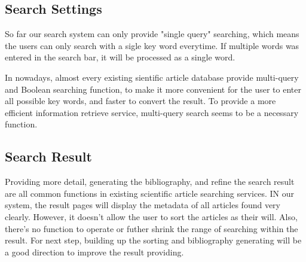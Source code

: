 \subsection{Search Settings}

So far our search system can only provide "single query" searching, which means the users can only search with a  sigle key word everytime.
If multiple words was entered in the search bar, it will be processed as a single word.

In nowadays, almost every existing sientific article database provide multi-query and Boolean searching function,
to make it more convenient for the user to enter all possible key words,
and faster to convert the result.
To provide a more efficient information retrieve service,
multi-query search seems to be a necessary function.

\subsection{Search Result}
Providing more detail, generating the bibliography, and refine the search result are all common functions in existing scientific article searching services.
IN our system, the result pages will display the metadata of all articles found very clearly.
However, it doesn't allow the user to sort the articles as their will. Also,
there's no function to operate or futher shrink the range of searching within the result.
For next step,
building up the sorting and bibliography generating will be a good direction to improve the result providing.

